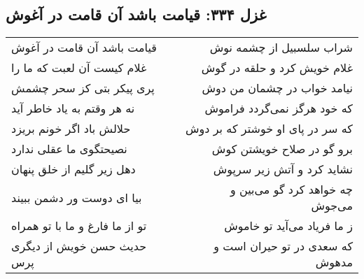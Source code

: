 \begin{center}
\section*{غزل ۳۳۴: قیامت باشد آن قامت در آغوش}
\label{sec:334}
\begin{longtable}{l p{0.5cm} r}
قیامت باشد آن قامت در آغوش
&&
شراب سلسبیل از چشمه نوش
\\
غلام کیست آن لعبت که ما را
&&
غلام خویش کرد و حلقه در گوش
\\
پری پیکر بتی کز سحر چشمش
&&
نیامد خواب در چشمان من دوش
\\
نه هر وقتم به یاد خاطر آید
&&
که خود هرگز نمی‌گردد فراموش
\\
حلالش باد اگر خونم بریزد
&&
که سر در پای او خوشتر که بر دوش
\\
نصیحتگوی ما عقلی ندارد
&&
برو گو در صلاح خویشتن کوش
\\
دهل زیر گلیم از خلق پنهان
&&
نشاید کرد و آتش زیر سرپوش
\\
بیا ای دوست ور دشمن ببیند
&&
چه خواهد کرد گو می‌بین و می‌جوش
\\
تو از ما فارغ و ما با تو همراه
&&
ز ما فریاد می‌آید تو خاموش
\\
حدیث حسن خویش از دیگری پرس
&&
که سعدی در تو حیران است و مدهوش
\\
\end{longtable}
\end{center}

